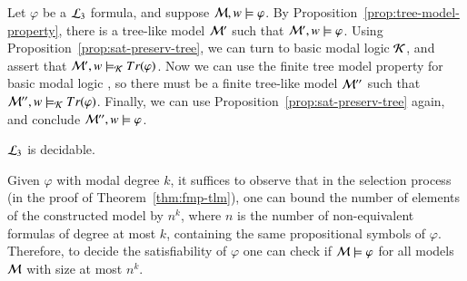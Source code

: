 \begin{pf}
Let $\varphi$ be a $\mathcal{L}_3$ formula, and suppose $\mathcal{M},w \models
\varphi$. By Proposition~\ref{prop:tree-model-property}, there is a
tree-like model $\mathcal{M}'$ such that $\mathcal{M}',w \models \varphi$.
Using Proposition~\ref{prop:sat-preserv-tree}, we can turn to basic
modal logic $\mathcal{K}$, and assert that $\mathcal{M}',w \models_{\mathcal{K}}
Tr(\varphi)$. Now we can use the finite tree model property for
basic modal logic \cite{??}, so there must be a finite tree-like
model $\mathcal{M}''$ such that $\mathcal{M}'',w \models_{\mathcal{K}} Tr(\varphi)$.
Finally, we can use Proposition~\ref{prop:sat-preserv-tree} again,
and conclude $\mathcal{M}'',w \models \varphi$.
\end{pf}





\begin{cor}[Decidability]\label{cor:tlm-decidability}
$\mathcal{L}_3$ is decidable.
\end{cor}

\begin{pf}
Given $\varphi$ with modal degree $k$, it suffices to observe that
in the selection process (in the proof of
Theorem~\ref{thm:fmp-tlm}), one can bound the number of elements of
the constructed model by $n^k$, where $n$ is the number of
non-equivalent formulas of degree at most $k$, containing the same
propositional symbols of $\varphi$. Therefore, to decide the
satisfiability of $\varphi$ one can check if $\mathcal{M}\models\varphi$
for all models $\mathcal{M}$ with size at most $n^k$.
\end{pf}

